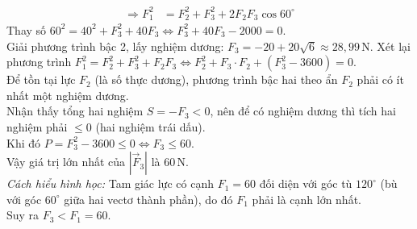 \begin{ex}
{\begin{itemchoice}
\begin{align*}
				\Rightarrow F_1^2 &= F_2^2 + F_3^2 + 2 F_2 F_3 \cos 60^{\circ}
			\end{align*}
			Thay số $60^2 = 40^2 + F_3^2 + 40 F_3 \Leftrightarrow F_3^2 + 40F_3 - 2000 = 0$.
			\\Giải phương trình bậc 2, lấy nghiệm dương: $F_3 = -20 + 20\sqrt{6} \approx 28{,}99$\,N.			
			\itemch Xét lại phương trình $F_1^2 = F_2^2 + F_3^2 + F_2F_3 \Leftrightarrow F_2^2 + F_3 \cdot F_2 + (F_3^2 - 3600) = 0$.
			\\Để tồn tại lực $F_2$ (là số thực dương), phương trình bậc hai theo ẩn $F_2$ phải có ít nhất một nghiệm dương.
			\\Nhận thấy tổng hai nghiệm $S = -F_3 < 0$, nên để có nghiệm dương thì tích hai nghiệm phải $\le 0$ (hai nghiệm trái dấu).
			\\Khi đó $P = F_3^2 - 3600 \le 0 \Leftrightarrow F_3 \le 60$.
			\\Vậy giá trị lớn nhất của $\left|\overrightarrow{F}_3\right|$ là $60\,\mathrm{N}$. 
			\\\textit{Cách hiểu hình học:} Tam giác lực có cạnh $F_1=60$ đối diện với góc tù $120^\circ$ (bù với góc $60^\circ$ giữa hai vectơ thành phần), do đó $F_1$ phải là cạnh lớn nhất.\\
			Suy ra $F_3 < F_1 = 60$.
		\end{itemchoice}
	}
\end{ex}


